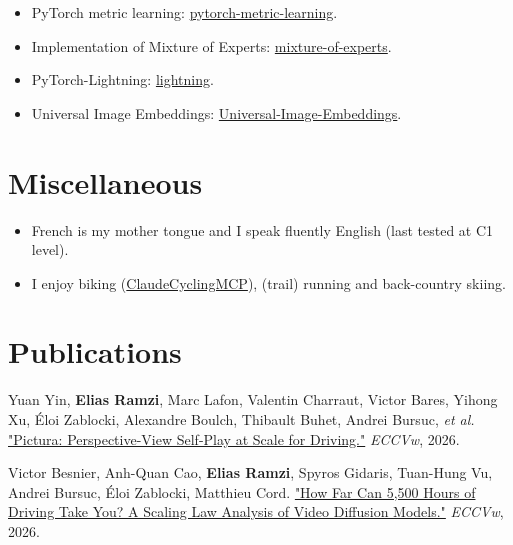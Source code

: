 \documentclass[11pt,a4paper,roman]{moderncv}        %
\newcommand*{\skillgroup}[2]{%
  \par\addvspace{.5em}{\bfseries #1}\par\nopagebreak
  {\small #2}\par\addvspace{.3em}}
\begin{document}
{{\skillgroup{Contributions to open-source}{
   \begin{itemize}
   \item PyTorch metric learning: \href{https://github.com/KevinMusgrave/pytorch-metric-learning/pull/303}{\faGithub\enspace pytorch-metric-learning}.
   \item Implementation of Mixture of Experts: \href{https://github.com/davidmrau/mixture-of-experts/pull/14}{\faGithub\enspace mixture-of-experts}.
   \item PyTorch-Lightning: \href{https://github.com/Lightning-AI/lightning/pull/2319}{\faGithub \enspace lightning}.
   \item Universal Image Embeddings: \href{https://github.com/nikosips/Universal-Image-Embeddings/tree/master\#acknowledgements}{\faGithub \enspace  Universal-Image-Embeddings}.
 \end{itemize}}


\section{Miscellaneous}

\begin{itemize}
    \item French is my mother tongue and I speak fluently English (last tested at C1 level).
    \item I enjoy biking (\href{https://github.com/elias-ramzi/ClaudeCyclingMCP/}{\faGithub\enspace ClaudeCyclingMCP}), (trail) running and back-country skiing.
\end{itemize}


 \section{Publications}

Yuan Yin, \textbf{Elias Ramzi}, Marc Lafon, Valentin Charraut, Victor Bares, Yihong Xu, {\'E}loi Zablocki, Alexandre Boulch, Thibault Buhet, Andrei Bursuc, \textit{et al.} \href{https://arxiv.org/abs/2607.26005}{"Pictura: Perspective-View Self-Play at Scale for Driving."} \textit{ECCVw}, 2026.

 \smallskip

Victor Besnier, Anh-Quan Cao, \textbf{Elias Ramzi}, Spyros Gidaris, Tuan-Hung Vu, Andrei Bursuc, {\'E}loi Zablocki, Matthieu Cord. \href{https://arxiv.org/abs/2608.28404}{"How Far Can 5,500 Hours of Driving Take You? A Scaling Law Analysis of Video Diffusion Models."} \textit{ECCVw}, 2026.

}}
\end{document}
